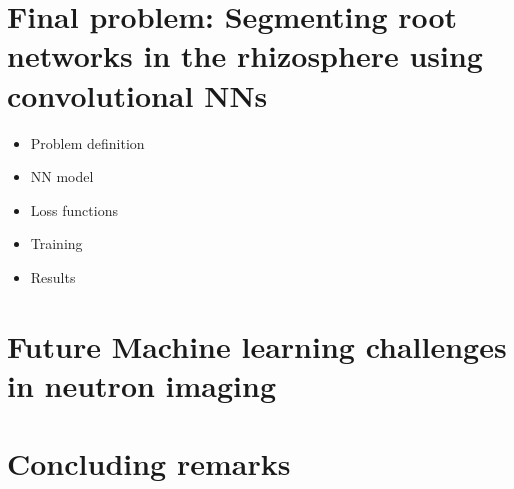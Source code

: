 \documentclass[letterpaper,10pt,english]{sphinxmanual}
\begin{document}
\chapter{Final problem: Segmenting root networks in the rhizosphere using convolutional NNs}
\label{\detokenize{ML4NeutronImageSegmentation:final-problem-segmenting-root-networks-in-the-rhizosphere-using-convolutional-nns}}\begin{itemize}
\item {} 
Problem definition

\item {} 
NN model

\item {} 
Loss functions

\item {} 
Training

\item {} 
Results

\end{itemize}


\chapter{Future Machine learning challenges in neutron imaging}
\label{\detokenize{ML4NeutronImageSegmentation:future-machine-learning-challenges-in-neutron-imaging}}

\chapter{Concluding remarks}
\label{\detokenize{ML4NeutronImageSegmentation:concluding-remarks}}






\renewcommand{\indexname}{Index}
\printindex
\end{document}

